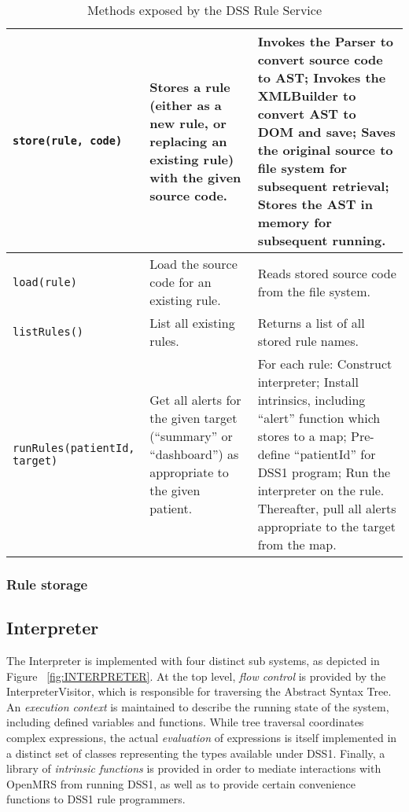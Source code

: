 \documentclass[12pt,letterpaper]{article}
\begin{document}
{\begin{table}
\begin{center}
\begin{tabular}{ l | p{1in} | p{2in} }
\texttt{store(rule, code)}
&
Stores a rule (either as a new rule, or replacing an existing rule) with the given source code.
&
Invokes the Parser to convert source code to AST; 
Invokes the XMLBuilder to convert AST to DOM and save; 
Saves the original source to file system for subsequent retrieval; 
Stores the AST in memory for subsequent running.
\\ \hline

\texttt{load(rule)}
&
Load the source code for an existing rule.
&
Reads stored source code from the file system.
\\ \hline

\texttt{listRules()}
&
List all existing rules.
&
Returns a list of all stored rule names.
\\ \hline

\texttt{runRules(patientId, target)}
&
Get all alerts for the given target (“summary” or “dashboard”) as appropriate to the given patient.
&
For each rule:
Construct interpreter; 
Install intrinsics, including “alert” function which stores to a map;
Pre-define “patientId” for DSS1 program;
Run the interpreter on the rule.
Thereafter, pull all alerts appropriate to the target from the map.
\\ \hline

\end{tabular}
\end{center}
\caption{Methods exposed by the DSS Rule Service}
\label{tab:RULE_SERVICE}
\end{table}

\subsubsection{Rule storage}

\subsection{Interpreter}

The Interpreter is implemented with four distinct sub systems, as depicted in Figure ~\ref{fig:INTERPRETER}.
At the top level, \emph{flow control} is provided by the InterpreterVisitor, which is responsible for traversing the Abstract Syntax Tree. An \emph{execution context} is maintained to describe the running state of the system, including defined variables and functions. While tree traversal coordinates complex expressions, the actual \emph{evaluation} of expressions is itself implemented in a distinct set of classes representing the types available under DSS1. Finally, a library of \emph{intrinsic functions} is provided in order to mediate interactions with OpenMRS from running DSS1, as well as to provide certain convenience functions to DSS1 rule programmers.

}
\end{document}
